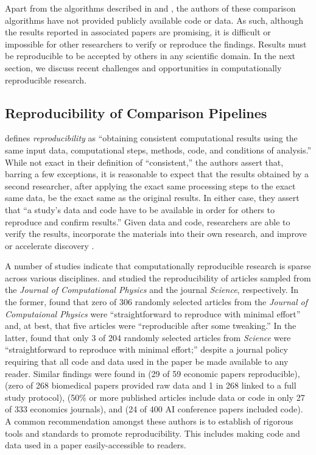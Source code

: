 \documentclass[11pt,]{isuthesis}
\begin{document}
Apart from the algorithms described in \citet{tai_fully_2018} and \citet{Tai2019}, the authors of these comparison algorithms have not provided publicly available code or data.
As such, although the results reported in associated papers are promising, it is difficult or impossible for other researchers to verify or reproduce the findings.
Results must be reproducible to be accepted by others in any scientific domain.
In the next section, we discuss recent challenges and opportunities in computationally reproducible research.

\hypertarget{reproducibility-of-comparison-pipelines}{%
\subsection{Reproducibility of Comparison Pipelines}\label{reproducibility-of-comparison-pipelines}}

\citet{nasem_2019} defines \emph{reproducibility} as ``obtaining consistent computational results using the same input data, computational steps, methods, code, and conditions of analysis.''
While not exact in their definition of ``consistent,'' the authors assert that, barring a few exceptions, it is reasonable to expect that the results obtained by a second researcher, after applying the exact same processing steps to the exact same data, be the exact same as the original results.
In either case, they assert that ``a study's data and code have to be available in order for others to reproduce and confirm results.''
Given data and code, researchers are able to verify the results, incorporate the materials into their own research, and improve or accelerate discovery \citep{Stodden2018b}.

A number of studies indicate that computationally reproducible research is sparse across various disciplines.
\citet{Stodden2018b} and \citet{Stodden2018a} studied the reproducibility of articles sampled from the \emph{Journal of Computational Physics} and the journal \emph{Science}, respectively.
In the former, \citet{Stodden2018b} found that zero of 306 randomly selected articles from the \emph{Journal of Computaional Physics} were ``straightforward to reproduce with minimal effort'' and, at best, that five articles were ``reproducible after some tweaking.''
In the latter, \citet{Stodden2018a} found that only 3 of 204 randomly selected articles from \emph{Science} were ``straightforward to reproduce with minimal effort;'' despite a journal policy requiring that all code and data used in the paper be made available to any reader.
Similar findings were found in \citet{CChang2022} (29 of 59 economic papers reproducible), \citet{Iqbal2016} (zero of 268 biomedical papers provided raw data and 1 in 268 linked to a full study protocol), \citet{Duvendack2015} (50\% or more published articles include data or code in only 27 of 333 economics journals), and \citet{Gundersen2018} (24 of 400 AI conference papers included code).
A common recommendation amongst these authors is to establish of rigorous tools and standards to promote reproducibility.
This includes making code and data used in a paper easily-accessible to readers.
\end{document}
